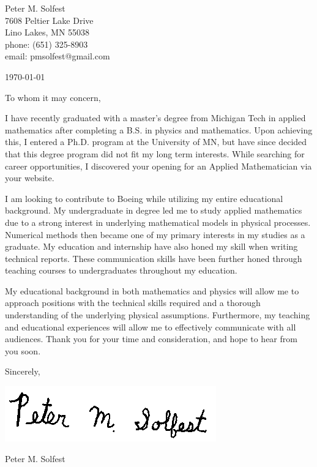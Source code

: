 \documentclass[letterpaper,12pt]{article}
\begin{document}
Peter M. Solfest\\
7608 Peltier Lake Drive\\
Lino Lakes, MN 55038\\
phone: (651) 325-8903\\
email: pmsolfest@gmail.com

\today


To whom it may concern, %

I have recently graduated with a master's degree from Michigan Tech in applied mathematics after
completing a B.S. in physics and mathematics.
Upon achieving this, I entered a Ph.D. program at the University of MN, but have since
decided that this degree program did not fit my long term interests.
While searching for career opportunities, I discovered your opening for an
Applied Mathematician via your website.

I am looking to contribute to Boeing while utilizing my entire educational background.
My undergraduate in degree led me to study applied mathematics due to a strong
interest in underlying mathematical models in physical processes.
Numerical methods then became one of my primary interests in my studies as a graduate.
My education and internship have also honed my skill when writing technical reports.
These communication skills have been further honed through teaching courses to undergraduates
throughout my education.

My educational background in both mathematics and physics will allow 
me to approach positions with the technical skills required and a thorough understanding
of the underlying physical assumptions.
Furthermore, my teaching and educational experiences will allow me to 
effectively communicate with all audiences.
Thank you for your time and consideration, and hope to hear from you soon.

Sincerely,

\includegraphics[height=.5in]{signature.png}

Peter M. Solfest
\end{document}
